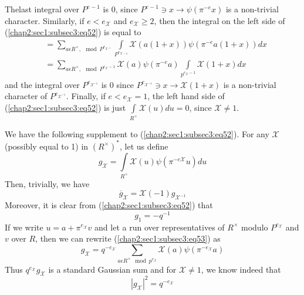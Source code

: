  The\pageoriginale last integral over $P^{e-1}$ is $0$, since $P^{e-1}\ni x
 \rightarrow\psi(\pi^{-e}x)$ is a non-trivial character. Similarly, if
 $e<e_{\mathcal{X}}$ and $e_{\mathcal{X}}\ge 2$, then the integral on the
   left side of (\ref{chap2:sec1:subsec3:eq52}) is equal to
\begin{align*}
  & =\sum_{a\epsilon R^{\times},\mod P^{e_{\mathcal{X}^{-1}}}}
  \int\limits_{P^{e_{\mathcal{X}-1}}}\mathcal{X}(a(1+x))\psi(\pi^{-e}a(1+x))dx\\
  & =\sum\limits_{a\epsilon R^{\times},\mod
  P^{e_{\mathcal{X}}-1}} \mathcal{X}(a)\psi(\pi^{-e}a)
  \int\limits_{p^{e_{\mathcal{X}} -1}}\mathcal{X}(1+x)dx 
\end{align*}
 and the integral over $P^{e_{\mathcal{X}^{-1}}}$ is $0$ since
 $P^{e_{\mathcal{X}^{-1}}}\ni x\rightarrow \mathcal{X}(1+x)$ is a
 non-trivial character of $P^{e_{\mathcal{X}^{-1}}}$. Finally, if
 $e<e_{\mathcal{X}}=1$, the left hand side of
 (\ref{chap2:sec1:subsec3:eq52}) is just 
 $\int\limits_{R^{\times}}\mathcal{X}(u)du=0$, since $\mathcal{X}\neq
 1$.

We have the following supplement to (\ref{chap2:sec1:subsec3:eq52}). For any
$\mathcal{X}$(possibly equal to 1) in $(R^{\times})^{\ast}$, let us
define
\begin{equation*}
  g_{\mathcal{X}}=\int\limits_{R^{\times}}\mathcal{X}(u)\psi
  (\pi^{-e\mathcal{X}}u)du\tag{53}\label{chap2:sec1:subsec3:eq53}
\end{equation*}
Then, trivially, we have
\begin{equation*}
  \overline{g}_{\mathcal{X}}=\mathcal{X}(-1)g_{\mathcal{X}^{-1}}
  \tag{54}\label{chap2:sec1:subsec3:eq54}
\end{equation*}
Moreover, it is clear from (\ref{chap2:sec1:subsec3:eq52}) that 
\begin{equation*}
  g_{1}=-q^{-1}\tag{55}\label{chap2:sec1:subsec3:eq55}
\end{equation*}
 If we write $u=a+\pi^{e_{\mathcal{X}}}v$ and let a run over
 representatives of $R^{\times}$ modulo $P^{e_{\mathcal{X}}}$ and $v$
 over $R$, then we can rewrite (\ref{chap2:sec1:subsec3:eq53}) as 
\begin{equation*}
  g_{\mathcal{X}}=q^{-e_{\mathcal{X}}}\sum\limits_{a\epsilon
    R^{\times}\mod
    p^{e_{\mathcal{X}}}}  \mathcal{X}(a) \psi
  (\pi^{-e_{\mathcal{X}}}a) \tag{56}\label{chap2:sec1:subsec3:eq56}  
\end{equation*}
Thus $q^{e_{\mathcal{X}}}g_{\mathcal{X}}$ is a standard Gaussian sum
and for $\mathcal{X}\neq 1$, we know indeed that 
\begin{equation*}
  |g_{\mathcal{X}}|^{2}=q^{-e_{\mathcal{X}}}\tag{57}\label{chap2:sec1:subsec3:eq57}  
\end{equation*}

